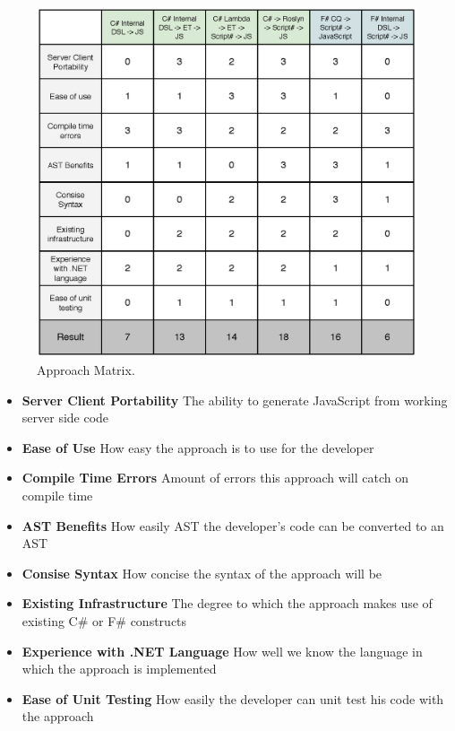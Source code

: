 	\begin{figure}
		\begin{center}
			\centerline{\includegraphics[width=16cm]{resources/images/approachmatrix.eps}}
		\end{center}
		\caption{Approach Matrix.}
		\label{approachMatrix}
	\end{figure}

	\begin{itemize}
		\item \textbf{Server Client Portability} The ability to generate JavaScript from working server side code
		\item \textbf{Ease of Use} How easy the approach is to use for the developer
		\item \textbf{Compile Time Errors} Amount of errors this approach will catch on compile time
		\item \textbf{AST Benefits} How easily AST the developer's code can be converted to an AST
		\item \textbf{Consise Syntax} How concise the syntax of the approach will be
		\item \textbf{Existing Infrastructure} The degree to which the approach makes use of existing C\# or F\# constructs
		\item \textbf{Experience with .NET Language} How well we know the language in which the approach is implemented
		\item \textbf{Ease of Unit Testing} How easily the developer can unit test his code with the approach
	\end{itemize}

